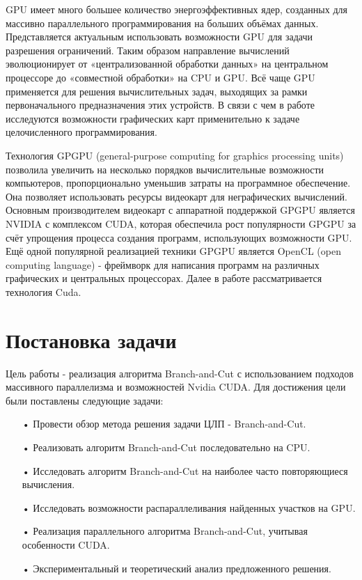 \documentclass[a4paper,14pt,russian]{extreport}
\begin{document}
\par GPU имеет много большее количество энергоэффективных ядер, созданных для массивно параллельного программирования на больших объёмах данных. Представляется актуальным использовать возможности GPU для задачи разрешения ограничений. Таким образом направление вычислений эволюционирует от «централизованной обработки данных» на центральном процессоре до «совместной обработки» на CPU и GPU. Всё чаще GPU применяется для решения вычислительных задач, выходящих за рамки первоначального предназначения этих устройств. В связи с чем в работе исследуются возможности графических карт применительно к задаче целочисленного программирования. 
\par Технология GPGPU (general-purpose computing for graphics processing units) позволила увеличить на несколько порядков вычислительные возможности компьютеров, пропорционально уменьшив затраты на программное обеспечение. Она позволяет использовать ресурсы видеокарт для неграфических вычислений. Основным производителем видеокарт с аппаратной поддержкой GPGPU является NVIDIA с комплексом CUDA, которая обеспечила рост популярности GPGPU за счёт упрощения процесса создания программ, использующих возможности GPU. Ещё одной популярной реализацией техники GPGPU является OpenCL (open computing language) - фреймворк для написания программ на различных графических и центральных процессорах. Далее в работе рассматривается технология Cuda.


\section{Постановка задачи}

Цель работы - реализация алгоритма Branch-and-Cut с использованием подходов массивного параллелизма и возможностей Nvidia CUDA. Для достижения цели были поставлены следующие задачи: 
  \begin{itemize}
  \item[•] Провести обзор метода решения задачи ЦЛП - Branch-and-Cut.
  \item[•] Реализовать алгоритм Branch-and-Cut последовательно на CPU.
  \item[•] Исследовать алгоритм Branch-and-Cut на наиболее часто повторяющиеся вычисления.
  \item[•] Исследовать возможности распараллеливания найденных участков на GPU.
  \item[•] Реализация параллельного алгоритма Branch-and-Cut, учитывая особенности CUDA.
  \item[•] Экспериментальный и теоретический анализ предложенного решения.
  \end{itemize}
\end{document}

